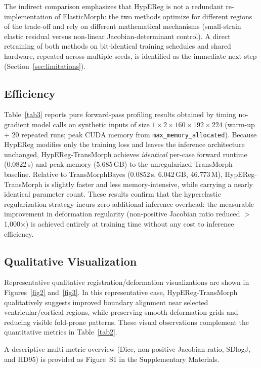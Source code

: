 \documentclass[jimaging,article,submit,pdftex,moreauthors]{Definitions/mdpi}
\begin{document}
The indirect comparison emphasizes that HypEReg is not a redundant re-implementation of ElasticMorph: the two methods optimize for different regions of the trade-off and rely on different mathematical mechanisms (small-strain elastic residual versus non-linear Jacobian-determinant control). A direct retraining of both methods on bit-identical training schedules and shared hardware, repeated across multiple seeds, is identified as the immediate next step (Section~\ref{sec:limitations}).

\subsection{Efficiency}
Table~\ref{tab3} reports pure forward-pass profiling results obtained by timing no-gradient model calls on synthetic inputs of size $1\times2\times160\times192\times224$ (warm-up + 20 repeated runs; peak CUDA memory from \texttt{max\_memory\_allocated}). Because HypEReg modifies only the training loss and leaves the inference architecture unchanged, HypEReg-TransMorph achieves \emph{identical} per-case forward runtime (0.0822\,s) and peak memory (5.685\,GB) to the unregularized TransMorph baseline. Relative to TransMorphBayes (0.0852\,s, 6.042\,GB, 46.773\,M), HypEReg-TransMorph is slightly faster and less memory-intensive, while carrying a nearly identical parameter count. These results confirm that the hyperelastic regularization strategy incurs zero additional inference overhead: the measurable improvement in deformation regularity (non-positive Jacobian ratio reduced $>$1,000$\times$) is achieved entirely at training time without any cost to inference efficiency.

\subsection{Qualitative Visualization}
Representative qualitative registration/deformation visualizations are shown in Figures~\ref{fig2} and~\ref{fig3}. In this representative case, HypEReg-TransMorph qualitatively suggests improved boundary alignment near selected ventricular/cortical regions, while preserving smooth deformation grids and reducing visible fold-prone patterns. These visual observations complement the quantitative metrics in Table~\ref{tab2}.

\noindent A descriptive multi-metric overview (Dice, non-positive Jacobian ratio, SDlogJ, and HD95) is provided as Figure~S1 in the Supplementary Materials.
\end{document}
